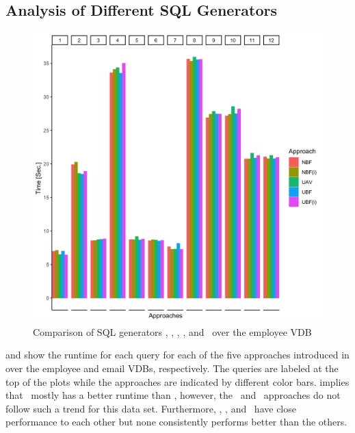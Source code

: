 \subsection{Analysis of Different SQL Generators}
\label{sec:exp-gen}



\begin{figure}[!t]
\centering
\includegraphics[scale=0.12] {figs/plots/emp1-5.png}
\caption[Comparison of SQL generators \nbf, \nbfi, \uav, \ubf, and \ubfi\ over the employee VDB]{Comparison of SQL generators \nbf, \nbfi, \uav, \ubf, and \ubfi\ over the employee VDB}
\label{fig:emp1-5}
\end{figure}



 and  show the runtime for each query
for each of the five approaches introduced in  over the employee and email VDBs, respectively. 
The queries are labeled at the top of the plots while the 
approaches are indicated by different color bars.
%
 implies that  \nbfi\ mostly has a better
runtime than \nbf, however, the \ubf\ and \ubfi\ approaches do not follow such a trend for this data set. 
Furthermore, 
\nbfi, \uav, and \ubf\ have close performance to each other but none consistently performs 
better than the others. 
%

